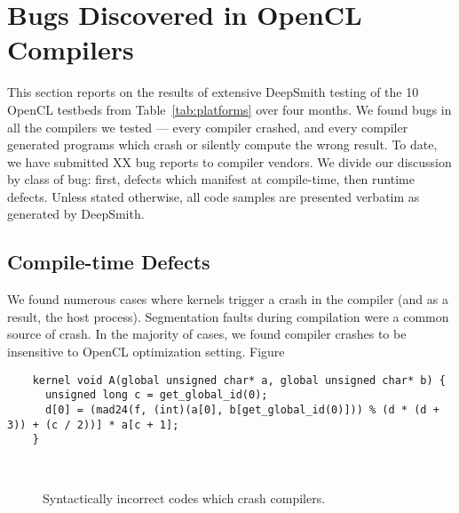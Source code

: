 \section{Bugs Discovered in OpenCL Compilers}

This section reports on the results of extensive DeepSmith testing of the 10 OpenCL testbeds from Table~\ref{tab:platforms} over four months. We found bugs in all the compilers we tested --- every compiler crashed, and every compiler generated programs which crash or silently compute the wrong result. To date, we have submitted XX bug reports to compiler vendors. We divide our discussion by class of bug: first, defects which manifest at compile-time, then runtime defects. Unless stated otherwise, all code samples are presented verbatim as generated by DeepSmith.


\subsection{Compile-time Defects}

We found numerous cases where kernels trigger a crash in the compiler (and as a result, the host process). Segmentation faults during compilation were a common source of crash. In the majority of cases, we found compiler crashes to be insensitive to OpenCL optimization setting. Figure~

\newsavebox{\OclgrindSemaAssertion}
\begin{lrbox}{\OclgrindSemaAssertion}
  \hspace{1.5em}
  \begin{lstlisting}
    kernel void A(global unsigned char* a, global unsigned char* b) {
      unsigned long c = get_global_id(0);
      d[0] = (mad24(f, (int)(a[0], b[get_global_id(0)])) % (d * (d + 3)) + (c / 2))] * a[c + 1];
    }
  \end{lstlisting}
\end{lrbox}

\begin{figure}
  \centering %
  \\%
  \caption{Syntactically incorrect codes which crash compilers.}
  \label{lst:bad-syntax}
\end{figure}


